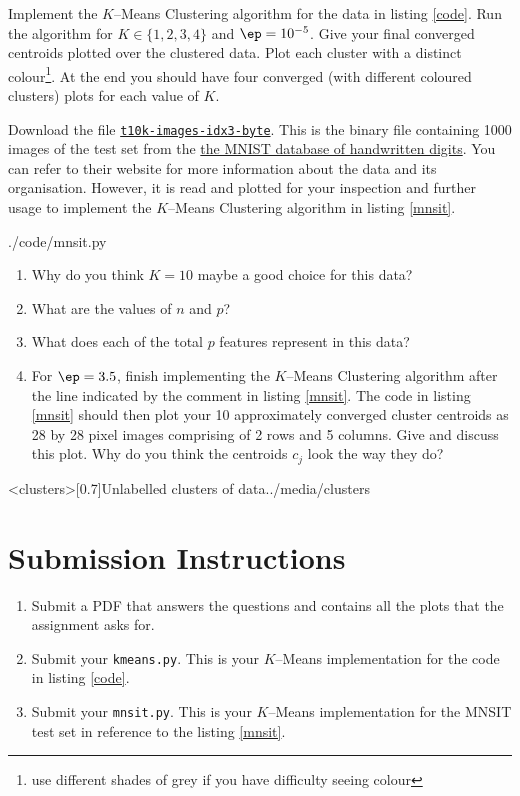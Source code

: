 \documentclass{homework}
\begin{document}
\question Implement the $K$--Means Clustering algorithm for the data in listing \ref{code}. Run the algorithm for $K \in \{1, 2, 3, 4\}$ and $\ep = 10^{-5}$. Give your final converged centroids plotted over the clustered data. Plot each cluster with a distinct colour\footnote{use different shades of grey if you have difficulty seeing colour}. At the end you should have four converged (with different coloured clusters) plots for each value of $K$.


\question Download the file \href{https://myokcuedu-my.sharepoint.com/:u:/g/personal/tashfeen_okcu_edu/EeqU1CH36W5Bp0YRgiRXxxUBuhzdI_JPec6CBlxsMBCtgA}{\texttt{t10k-images-idx3-byte}}. This is the binary file containing 1000 images of the test set from the \href{http://yann.lecun.com/exdb/mnist/}{the MNIST database of handwritten digits}. You can refer to their website for more information about the data and its organisation. However, it is read and plotted for your inspection and further usage to implement the $K$--Means Clustering algorithm in listing \ref{mnsit}.


{./code/mnsit.py}

\begin{enumerate}
    \item Why do you think $K=10$ maybe a good choice for this data?
    \item What are the values of $n$ and $p$?
    \item What does each of the total $p$ features represent in this data?
    \item For $\ep = 3.5$, finish implementing the $K$--Means Clustering algorithm after the line indicated by the comment in listing \ref{mnsit}. The code in listing \ref{mnsit} should then plot your 10 approximately converged cluster centroids as 28 by 28 pixel images comprising of 2 rows and 5 columns. Give and discuss this plot. Why do you think the centroids $c_j$ look the way they do?
\end{enumerate}

\img<clusters>[0.7]{Unlabelled clusters of data.}{./media/clusters}

\section*{Submission Instructions}

\begin{enumerate}
    \item Submit a PDF that answers the questions and contains all the plots that the assignment asks for.
    \item Submit your \texttt{kmeans.py}. This is your $K$--Means implementation for the code in listing \ref{code}.
    \item Submit your \texttt{mnsit.py}. This is your $K$--Means implementation for the MNSIT test set in reference to the listing \ref{mnsit}.
\end{enumerate}
\end{document}
